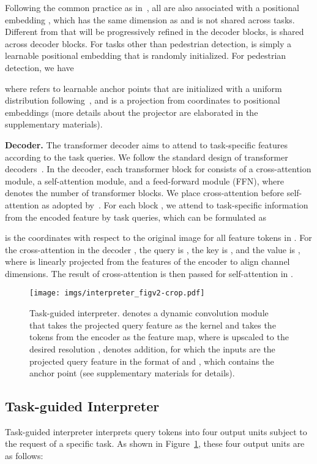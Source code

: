 \documentclass[10pt,twocolumn,letterpaper]{article}
\begin{document}
Following the common practice as in~\cite{vaswani2017attention,cheng2022masked,wang2022anchor}, all  are also associated with a positional embedding  , which has the same dimension as  and is not shared across tasks. Different from  that will be progressively refined in the decoder blocks,  is shared across decoder blocks. 
For tasks other than pedestrian detection,  is simply a learnable positional embedding that is randomly initialized.
For pedestrian detection, we have

where  refers to  learnable anchor points that are initialized with a uniform distribution following~\cite{wang2022anchor}, and  is a projection from coordinates to positional embeddings (more details about the projector are elaborated in the supplementary materials).

\noindent\textbf{Decoder.} The transformer decoder aims to attend to task-specific features according to the task queries. We follow the standard design of transformer decoders~\cite{vaswani2017attention}. In the decoder, each transformer block  for  consists of a cross-attention module, a self-attention module, and a feed-forward module (FFN), where  denotes the number of transformer blocks. We place cross-attention before self-attention as adopted by~\cite{cheng2022masked,li2022mask}. For each block , we attend to task-specific information from the encoded feature by task queries, which can be formulated as 


 is the coordinates with respect to the original image for all feature tokens in . For the cross-attention in the decoder , the query is , the key is , and the value is , where  is linearly projected from the features of the encoder  to align channel dimensions.
The result of cross-attention is then passed for self-attention in .



\begin{figure}[t]
\centering
\texttt{[image: imgs/interpreter\_figv2-crop.pdf]}
\caption{Task-guided interpreter.   denotes a dynamic convolution module~\cite{chen2020dynamic} that takes the projected query feature as the kernel and takes the tokens  from the encoder as the feature map, where  is upscaled to the desired resolution  ,  denotes addition, for which the inputs are the projected query feature in the format of  and , which contains the anchor point  (see supplementary materials for details). }
\label{fig:interp}
\end{figure}
\subsection{Task-guided Interpreter} \label{sec:interpreter}
Task-guided interpreter  interprets  query tokens  into four output units subject to the request of a specific task.
As shown in Figure~\ref{fig:interp}, these four output units are as follows: 
\end{document}
